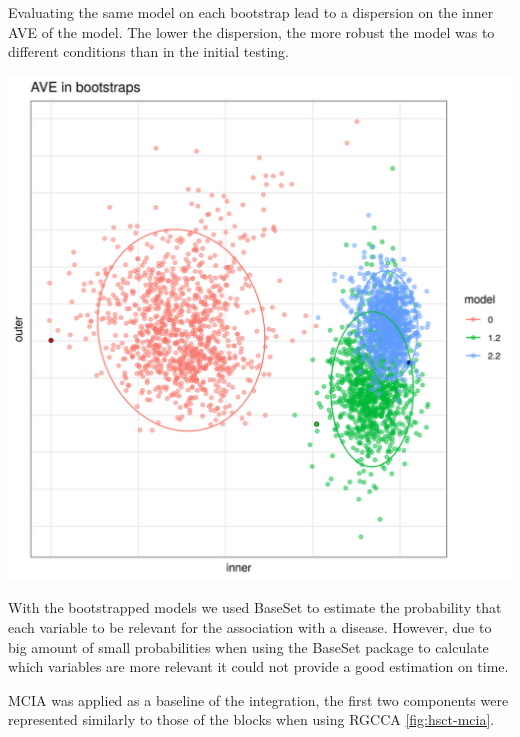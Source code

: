 \documentclass[
  12pt,
  a4paper,
  twoside,
  openright]{book}
\let\origfigure\figure
\let\endorigfigure\endfigure
\renewenvironment{figure}[1][2] {
    \expandafter\origfigure\expandafter[!ht]
} {
    \endorigfigure
}
\begin{document}
Evaluating the same model on each bootstrap lead to a dispersion on the inner AVE of the model.
The lower the dispersion, the more robust the model was to different conditions than in the initial testing.

\begin{figure}
\includegraphics[width=1\linewidth]{images/hsct-bootstrap} \caption[Bootstrap results on HSCT dataset.]{Bootstrap of the models 0, 1.2 and 2.2. The point with the black circle is the AVE of the original data. The dispersion is shown by the ellipses. Model 0 and 1.2 have lower inner and outer AVE score, model 2.2 has lower outer score but higher inner value than the bootstrapped.}\label{fig:hsct-bootstrap}
\end{figure}

With the bootstrapped models we used BaseSet to estimate the probability that each variable to be relevant for the association with a disease.
However, due to big amount of small probabilities when using the BaseSet package to calculate which variables are more relevant it could not provide a good estimation on time.

MCIA was applied as a baseline of the integration, the first two components were represented similarly to those of the blocks when using RGCCA \ref{fig:hsct-mcia}.
\end{document}
